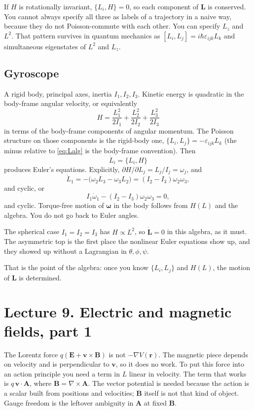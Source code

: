 \documentclass[11pt]{article}
\numberwithin{equation}{section}
\newcommand{\vect}[1]{\mathbf{#1}}
\begin{document}
If $H$ is rotationally invariant, $\{L_i,H\}=0$, so each component of $\vect{L}$ is conserved. You cannot always specify all three as labels of a trajectory in a naive way, because they do not Poisson-commute with each other. You can specify $L_z$ and $L^2$. That pattern survives in quantum mechanics as $[L_i,L_j]=i\hbar\varepsilon_{ijk}L_k$ and simultaneous eigenstates of $L^2$ and $L_z$.

\subsection{Gyroscope}

A rigid body, principal axes, inertia $I_1,I_2,I_3$. Kinetic energy is quadratic in the body-frame angular velocity, or equivalently
\[
H = \frac{L_1^2}{2I_1} + \frac{L_2^2}{2I_2} + \frac{L_3^2}{2I_3}
\]
in terms of the body-frame components of angular momentum. The Poisson structure on those components is the rigid-body one, $\{L_i,L_j\}=-\varepsilon_{ijk}L_k$ (the minus relative to \eqref{eq:Lalg} is the body-frame convention). Then
\[
\dot L_i = \{L_i,H\}
\]
produces Euler's equations. Explicitly, $\partial H/\partial L_j=L_j/I_j=\omega_j$, and
\[
\dot L_1 = -\bigl(\omega_2 L_3 - \omega_3 L_2\bigr) = (I_2-I_3)\omega_2\omega_3,
\]
and cyclic, or
\[
I_1\dot\omega_1 - (I_2-I_3)\omega_2\omega_3 = 0,
\]
and cyclic. Torque-free motion of $\vect{\omega}$ in the body follows from $H(L)$ and the algebra. You do not go back to Euler angles.

The spherical case $I_1=I_2=I_3$ has $H\propto L^2$, so $\dot{\vect{L}}=0$ in this algebra, as it must. The asymmetric top is the first place the nonlinear Euler equations show up, and they showed up without a Lagrangian in $\theta,\phi,\psi$.

That is the point of the algebra: once you know $\{L_i,L_j\}$ and $H(L)$, the motion of $\vect{L}$ is determined.

\section{Lecture 9. Electric and magnetic fields, part 1}

The Lorentz force $q(\vect{E}+\vect{v}\times\vect{B})$ is not $-\nabla V(\vect{r})$. The magnetic piece depends on velocity and is perpendicular to $\vect{v}$, so it does no work. To put this force into an action principle you need a term in $L$ linear in velocity. The term that works is $q\,\vect{v}\cdot\vect{A}$, where $\vect{B}=\nabla\times\vect{A}$. The vector potential is needed because the action is a scalar built from positions and velocities; $\vect{B}$ itself is not that kind of object. Gauge freedom is the leftover ambiguity in $\vect{A}$ at fixed $\vect{B}$.
\end{document}
